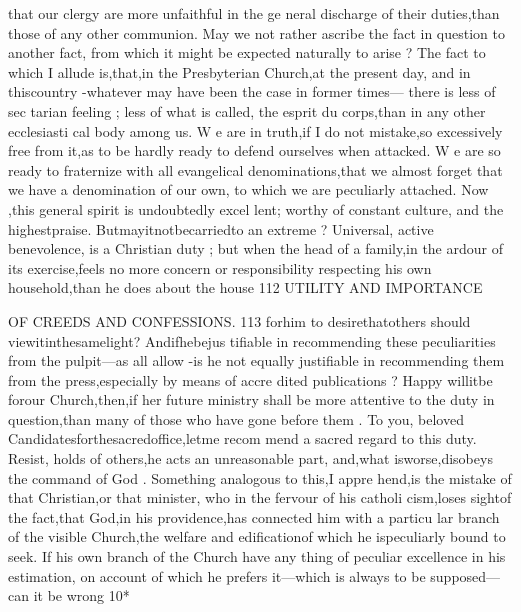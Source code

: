 \documentclass[
]{book}
\begin{document}
that our clergy are more unfaithful in the ge neral discharge of their duties,than those of any other communion. May we not rather ascribe the fact in question to another fact, from which it might be expected naturally to arise ? The fact to which I allude is,that,in
the Presbyterian Church,at the present day, and in thiscountry -whatever may have been the case in former times--- there is less of sec
tarian feeling ; less of what is called, the esprit du corps,than in any other ecclesiasti cal body among us. W e are in truth,if I do not mistake,so excessively free from it,as to be hardly ready to defend ourselves when attacked. W e are so ready to fraternize with all evangelical denominations,that we almost forget that we have a denomination of our own, to which we are peculiarly attached. Now ,this general spirit is undoubtedly excel lent; worthy of constant culture, and the highestpraise. Butmayitnotbecarriedto an extreme ? Universal, active benevolence, is a Christian duty ; but when the head of a family,in the ardour of its exercise,feels no more concern or responsibility respecting his own household,than he does about the house
112 UTILITY AND IMPORTANCE

OF CREEDS AND CONFESSIONS. 113
forhim to desirethatothers should
viewitinthesamelight? Andifhebejus tifiable in recommending these peculiarities
from the pulpit---as all allow -is he not
equally justifiable in recommending them from the press,especially by means of accre dited publications ?
Happy willitbe forour Church,then,if her future ministry shall be more attentive to the duty in question,than many of those who have gone before them . To you, beloved Candidatesforthesacredoffice,letme recom mend a sacred regard to this duty. Resist,
holds of others,he acts an unreasonable part,
and,what isworse,disobeys the command of God . Something analogous to this,I appre hend,is the mistake of that Christian,or that minister, who in the fervour of his catholi cism,loses sightof the fact,that God,in his providence,has connected him with a particu lar branch of the visible Church,the welfare and edificationof which he ispeculiarly bound to seek. If his own branch of the Church have any thing of peculiar excellence in his estimation, on account of which he prefers it---which is always to be supposed--- can it
be
wrong
10*
\end{document}
